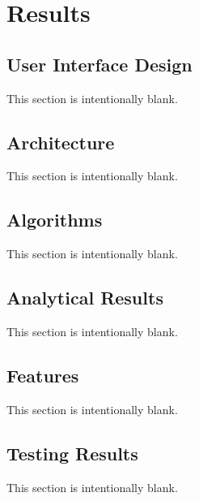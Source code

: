 \chapter{Results}



\section{User Interface Design}

This section is intentionally blank.




\section{Architecture}

This section is intentionally blank.




\section{Algorithms}

This section is intentionally blank.




\section{Analytical Results}

This section is intentionally blank.




\section{Features}

This section is intentionally blank.




\section{Testing Results}

This section is intentionally blank.

